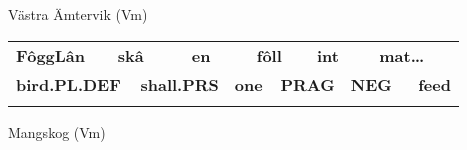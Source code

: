 
\begin{listWWNumileveli}
\item 

\end{listWWNumileveli}

\begin{listWWNumxviiileveli}
\item 

\begin{styleExLtrTbl}
Västra Ämtervik (Vm) 

\end{styleExLtrTbl}

\end{listWWNumxviiileveli}

\begin{tabular}{llllllllllll}
\lsptoprule
{\bfseries FôggLân} & \multicolumn{2}{l}{{\bfseries skâ}

} & \multicolumn{2}{l}{{\bfseries en}

} & \multicolumn{2}{l}{{\bfseries fôll}

} & \multicolumn{2}{l}{{\bfseries int}

} & \multicolumn{2}{l}{{\bfseries mat…}

} & \\
\multicolumn{2}{l}{{\bfseries bird.PL.DEF}

} & \multicolumn{2}{l}{{\bfseries shall.PRS}

} & \multicolumn{2}{l}{{\bfseries one}

} & \multicolumn{2}{l}{{\bfseries PRAG}

} & \multicolumn{2}{l}{{\bfseries NEG}

} & \multicolumn{2}{l}{{\bfseries feed}

}\\
\lspbottomrule
\end{tabular}

\begin{styleExLtrTblii}
Mangskog (Vm) 

\end{styleExLtrTblii}

